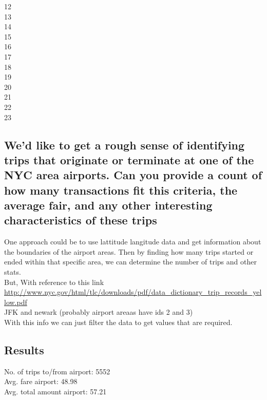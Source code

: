 \documentclass[letterpaper, 11pt]{article}
\begin{document}
12          \quad\quad\quad{}               \quad\quad\quad{}\\
13          \quad\quad\quad{}               \quad\quad\quad{}\\
14          \quad\quad\quad{}                \quad\quad\quad{}\\
15          \quad\quad\quad{}               \quad\quad\quad{}\\
16          \quad\quad\quad{}               \quad\quad\quad{}\\
17          \quad\quad\quad{}               \quad\quad\quad{}\\
18          \quad\quad\quad{}               \quad\quad\quad{}\\
19          \quad\quad\quad{}                \quad\quad\quad{}\\
20          \quad\quad\quad{}               \quad\quad\quad{}\\
21          \quad\quad\quad{}               \quad\quad\quad{}\\
22          \quad\quad\quad{}               \quad\quad\quad{}\\
23          \quad\quad\quad{}               \quad\quad\quad{}\\
\subsection*{We'd like to get a rough sense of identifying trips that originate or terminate at one of the NYC area
	airports. Can you provide a count of how many transactions fit this criteria, the average fair, and any other
interesting characteristics of these trips}

One approach could be to use lattitude langitude data and get information about the boundaries of the airport areas. Then by finding how many trips started or ended within that specific area, we can determine the number of trips and other stats.\\
But,  With reference to this link \\
\url{http://www.nyc.gov/html/tlc/downloads/pdf/data_dictionary_trip_records_yellow.pdf}\\
JFK and newark (probably airport areaas have ids 2 and 3)\\
With this info we can just filter the data to get values that are required.
\subsection*{Results}
\textbullet \quad No. of trips to/from airport:  5552\\
\textbullet \quad Avg. fare airport:  48.98\\
\textbullet \quad Avg. total amount airport: 57.21\\
\end{document}

